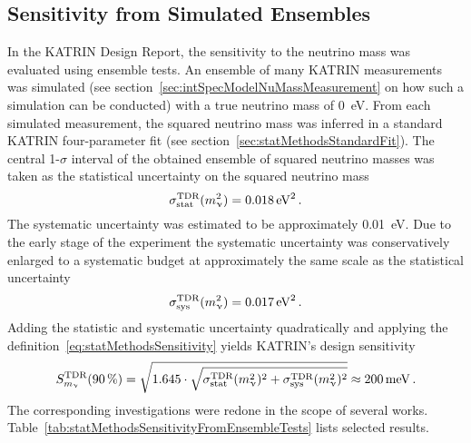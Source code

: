 \subsection{Sensitivity from Simulated Ensembles}
\label{sec:statMethodsSensitivtyFromEnsemble}
In the KATRIN Design Report, the sensitivity to the neutrino mass was evaluated using ensemble tests. An ensemble of many KATRIN measurements was simulated (see section~\ref{sec:intSpecModelNuMassMeasurement} on how such a simulation can be conducted) with a true neutrino mass of \SI{0}{eV}. From each simulated measurement, the squared neutrino mass was inferred in a standard KATRIN four-parameter fit (see section~\ref{sec:statMethodsStandardFit}). The central 1-$\sigma$ interval of the obtained ensemble of squared neutrino masses was taken as the statistical uncertainty on the squared neutrino mass~\cite{Angrik:2005ep}
\begin{equation}
	\sigma_\mathrm{stat}^\mathrm{TDR}(m_\upnu^2) = \SI{0.018}{eV^2}
	\text{\,.}
\end{equation}
The systematic uncertainty was estimated to be approximately \SI{0.01}{eV}. Due to the early stage of the experiment the systematic uncertainty was conservatively enlarged to a systematic budget at approximately the same scale as the statistical uncertainty~\cite{Angrik:2005ep}
\begin{equation}
	\label{eq:statMethodsSensitivtyFromEnsembleTDRSysBudget}
	\sigma_\mathrm{sys}^\mathrm{TDR}(m_\upnu^2) = \SI{0.017}{eV^2}
	\text{\,.}
\end{equation}
Adding the statistic and systematic uncertainty quadratically and applying the definition~\eqref{eq:statMethodsSensitivity} yields KATRIN's design sensitivity~\cite{Angrik:2005ep}
\begin{equation}
	\label{eq:statMethodsSensitivityDesignReport}
	S_{m_\upnu}^{\mathrm{TDR}}(\SI{90}{\percent}) = 
	\sqrt{1.645\cdot
		\sqrt{
		\sigma_\mathrm{stat}^\mathrm{TDR}(m_\upnu^2)^2+\sigma_\mathrm{sys}^\mathrm{TDR}(m_\upnu^2)^2
	}}
	\approx \SI{200}{meV}
	\text{\,.}
\end{equation}
The corresponding investigations were redone in the scope of several works. Table~\ref{tab:statMethodsSensitivityFromEnsembleTests} lists selected results.
